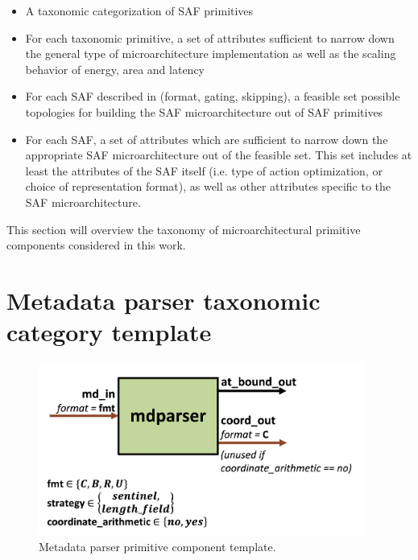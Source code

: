 %
\begin{itemize}
    \item A taxonomic categorization of SAF primitives
    \item For each taxonomic primitive, a set of attributes sufficient to narrow down the general type of microarchitecture implementation as well as the scaling behavior of energy, area and latency
    \item For each SAF described in \cite{sparseloop} (format, gating, skipping), a feasible set possible topologies for building the SAF microarchitecture out of SAF primitives
    \item For each SAF, a set of attributes which are sufficient to narrow down the appropriate SAF microarchitecture out of the feasible set. This set includes at least the attributes of the SAF itself (i.e. type of action optimization, or choice of representation format), as well as other attributes specific to the SAF microarchitecture.
\end{itemize}

This section will overview the taxonomy of microarchitectural primitive components considered in this work.

\section{Metadata parser taxonomic category template}

\begin{figure}[H]
    \centering
    \includegraphics[width=0.95\textwidth]{figures/mdparser.png}
    \caption{Metadata parser primitive component template.}
    \label{fig:mdparser}
\end{figure}

